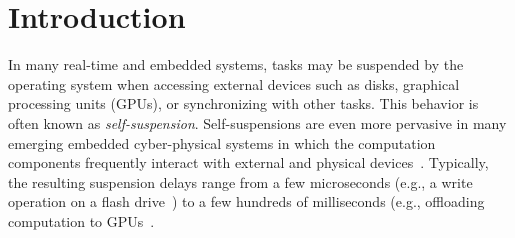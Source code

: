 \section{Introduction}

In many real-time and embedded systems, tasks may be suspended by the operating system when accessing external devices such as disks, graphical processing units (GPUs), or synchronizing with other tasks. 
This behavior is often known as \emph{self-suspension}. Self-suspensions are even more pervasive in many emerging embedded cyber-physical systems in which the computation components frequently interact with external and physical devices~\cite{Kang:rtss07,Kato_2011}. Typically, the resulting suspension delays range from a few microseconds (e.g., a write operation on a flash drive~\cite{Kang:rtss07}) to a few hundreds of milliseconds (e.g., offloading computation to GPUs~\cite{Kato_2011,Liu_2014}.

